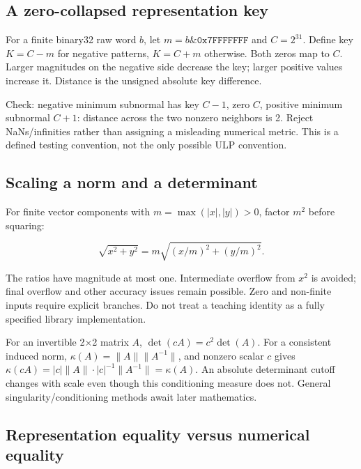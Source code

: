 \subsection{A zero-collapsed representation key}\label{01-foundations-i-ch011-a-zero-collapsed-representation-key}

For a finite binary32 raw word \(b\), let \(m=b\mathbin{\&}\texttt{0x7FFFFFFF}\) and \(C=2^{31}\). Define key \(K=C-m\) for negative patterns, \(K=C+m\) otherwise. Both zeros map to \(C\). Larger magnitudes on the negative side decrease the key; larger positive values increase it. Distance is the unsigned absolute key difference.

Check: negative minimum subnormal has key \(C-1\), zero \(C\), positive minimum subnormal \(C+1\): distance across the two nonzero neighbors is 2. Reject NaNs/infinities rather than assigning a misleading numerical metric. This is a defined testing convention, not the only possible ULP convention.

\subsection{Scaling a norm and a determinant}\label{01-foundations-i-ch011-scaling-a-norm-and-a-determinant}

For finite vector components with \(m=\max(|x|,|y|)>0\), factor \(m^2\) before squaring:

\[
\sqrt{x^2+y^2}=m\sqrt{(x/m)^2+(y/m)^2}.
\]

The ratios have magnitude at most one. Intermediate overflow from \(x^2\) is avoided; final overflow and other accuracy issues remain possible. Zero and non-finite inputs require explicit branches. Do not treat a teaching identity as a fully specified library implementation.

For an invertible 2×2 matrix \(A\), \(\det(cA)=c^2\det(A)\). For a consistent induced norm, \(\kappa(A)=\|A\|\|A^{-1}\|\), and nonzero scalar \(c\) gives \(\kappa(cA)=|c|\|A\|\cdot|c|^{-1}\|A^{-1}\|=\kappa(A)\). An absolute determinant cutoff changes with scale even though this conditioning measure does not. General singularity/conditioning methods await later mathematics.

\subsection{Representation equality versus numerical equality}\label{01-foundations-i-ch011-representation-equality-versus-numerical-equality}

